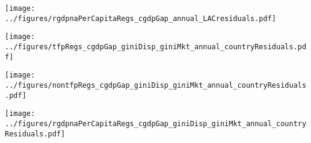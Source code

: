 \documentclass[12pt,english]{article}
\theoremstyle{remark}
\begin{document}
\begin{sidewaysfigure}[ht]
	\texttt{[image: ../figures/rgdpnaPerCapitaRegs\_cgdpGap\_annual\_LACresiduals.pdf]}
	\caption{}
\end{sidewaysfigure}




\begin{sidewaysfigure}[ht]
	\texttt{[image: ../figures/tfpRegs\_cgdpGap\_giniDisp\_giniMkt\_annual\_countryResiduals.pdf]}
	\caption{}
\end{sidewaysfigure}

\begin{sidewaysfigure}[ht]
	\texttt{[image: ../figures/nontfpRegs\_cgdpGap\_giniDisp\_giniMkt\_annual\_countryResiduals.pdf]}
	\caption{}
\end{sidewaysfigure}

\begin{sidewaysfigure}[ht]
	\texttt{[image: ../figures/rgdpnaPerCapitaRegs\_cgdpGap\_giniDisp\_giniMkt\_annual\_countryResiduals.pdf]}
	\caption{}
\end{sidewaysfigure}
\end{document}
